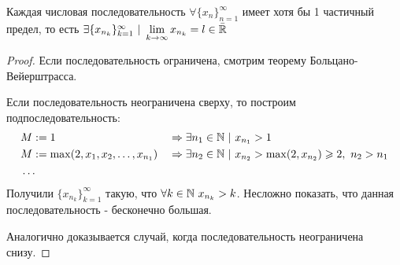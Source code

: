 \begin{addition}
	Каждая числовая последовательность $\forall \{x_n\}_{n = 1}^\infty$ имеет хотя бы 1 частичный предел, то есть $\exists \{x_{n_k}\}_{k = 1}^\infty\ |\ \lim\limits_{k \rightarrow \infty} x_{n_k} = l \in \bar{\mathbb{R}}$
\end{addition}

\begin{proof}
	Если последовательность ограничена, смотрим теорему Больцано-Вейерштрасса.
	
	Если последовательность неограничена сверху, то построим подпоследовательность:
	\begin{align*}
		&M := 1 & &\Rightarrow \exists n_1 \in \mathbb{N}\ |\ x_{n_1} > 1
		\\
		&M := \max(2, x_1, x_2, \dots, x_{n_1}) & &\Rightarrow \exists n_2 \in \mathbb{N}\ |\ x_{n_2} > \max(2, x_{n_2}) \geqslant 2,\ n_2 > n_1
		\\
		&\dots
	\end{align*}
	Получили $\{x_{n_k}\}_{k = 1}^\infty$ такую, что $\forall k \in \mathbb{N}\ x_{n_k} > k$. Несложно показать, что данная последовательность - бесконечно большая.
	
	Аналогично доказывается случай, когда последовательность неограничена снизу.
\end{proof}

